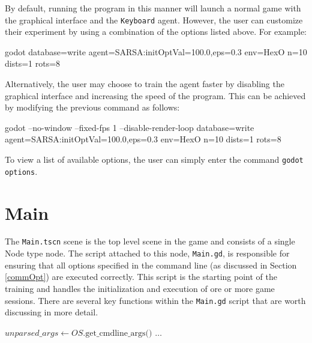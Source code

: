 By default, running the program in this manner will launch a normal game with the graphical interface and the \texttt{Keyboard} agent. However, the user can customize their experiment by using a combination of the options listed above. For example:

\begin{algorithm}
\begin{algorithmic}
\State godot database=write agent=SARSA:initOptVal=100.0,eps=0.3 env=HexO n=10 dists=1 rots=8
\end{algorithmic}
\end{algorithm}

Alternatively, the user may choose to train the agent faster by disabling the graphical interface and increasing the speed of the program. This can be achieved by modifying the previous command as follows:

\begin{algorithm}
\begin{algorithmic}
\State godot --no-window --fixed-fps 1 --disable-render-loop database=write agent=SARSA:initOptVal=100.0,eps=0.3 env=HexO n=10 dists=1 rots=8
\end{algorithmic}
\end{algorithm}

To view a list of available options, the user can simply enter the command \texttt{godot options}.

\section{Main}
The \texttt{Main.tscn} scene is the top level scene in the game and consists of a single Node type node. The script attached to this node, \texttt{Main.gd}, is responsible for ensuring that all options specified in the command line (as discussed in Section \ref{commOpt}) are executed correctly. This script is the starting point of the training and handles the initialization and execution of ore or more game sessions.
There are several key functions within the \texttt{Main.gd} script that are worth discussing in more detail.

\begin{algorithm}
\begin{algorithmic}[1]
\State $unparsed\_args \gets OS.\text{get\_cmdline\_args()}$
\State {}
\EndIf
\State $\dots$ 
\State {}
\Else
\State {}
\State {}
\State {}
\State {}
\EndIf
\State {}
\EndIf
\EndFunction
\end{algorithmic}
\end{algorithm}

